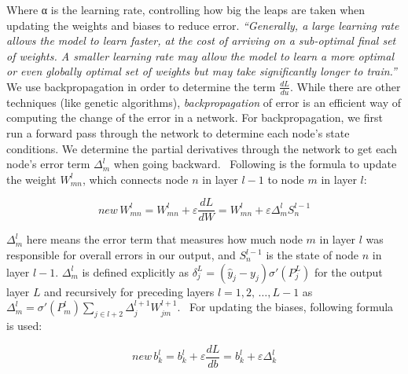 Where α is the learning rate, controlling how big the leaps are taken when updating the weights and biases to reduce error.
\textit{``Generally, a large learning rate allows the model to learn faster, at the cost of arriving on a sub-optimal final set of weights.
A smaller learning rate may allow the model to learn a more optimal or even globally optimal set of weights but may take significantly longer to train.''}~\cite{learning-rate}
We use backpropagation in order to determine the term $\frac{dL}{du}$.
While there are other techniques (like genetic algorithms), \textit{backpropagation} of error is an efficient way of computing the change of the error in a network.
For backpropagation, we first run a  forward pass through the network to determine each node's state conditions.
We determine the partial derivatives through the network to get each node's error term $\Delta^l_m$ when going backward.~\cite{ann-basics}
Following is the formula to update the weight $W^l_{mn}$, which connects node $n$ in layer $l - 1$ to node $m$ in layer $l$:

\[
        \mathit{new}\, W^l_{mn} = W^l_{mn} + \varepsilon \frac{dL}{dW} = W^l_{mn} + \varepsilon \Delta^l_m S^{l-1}_n
\]

$\Delta^l_m$ here means the error term that measures how much node $m$ in layer $l$ was responsible for overall errors in our output, and $S^{l-1}_n$ is the state of node $n$ in layer $l-1$.
$\Delta^l_m$ is defined explicitly as $\delta^L_j = (\hat y_j - y_j ) \sigma '(P^L_j)$ for the output layer $L$ and recursively for preceding layers $l = 1, 2,\, \ldots, L - 1$ as $ \Delta^l_m = \sigma '(P^l_m) \sum_{j \in l+2} \Delta^{l+1}_j W^{l+1}_{jm}$.~\cite{ann-basics}
For updating the biases, following formula is used:

\[
    new \, b^l_k = b^l_k + \varepsilon \frac{dL}{db} = b^l_k + \varepsilon \Delta^l_k
\]
